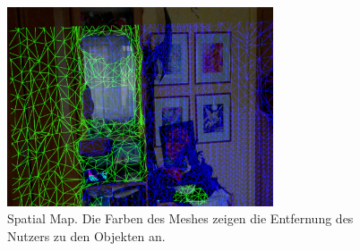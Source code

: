 \begin{figure}[H]
	\centering
	\includegraphics[width=0.7\textwidth]{images/ML_20201003_15.36.42.jpg}
	\caption[Spatial Mapping]{Spatial Map. Die Farben des Meshes zeigen die Entfernung des Nutzers zu den Objekten an.}
	\label{img:spatialmap}
\end{figure}


%
%
%


